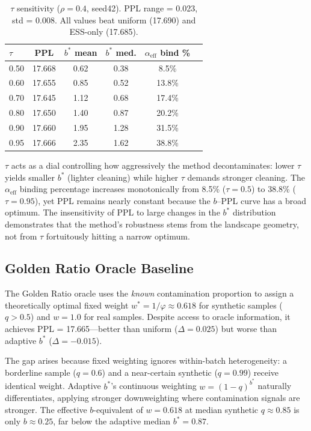 \documentclass[11pt,a4paper]{article}
\newcommand{\bstar}{b^{*}}
\newcommand{\aeff}{\alpha_{\mathrm{eff}}}
\begin{document}
\begin{table}[t]
\centering
\small
\caption{$\tau$ sensitivity ($\rho{=}0.4$, seed42). PPL range = 0.023, std = 0.008. All values beat uniform (17.690) and ESS-only (17.685).}
\label{tab:tau}
\begin{tabular}{lccccc}
\toprule
$\tau$ & PPL & $\bstar$ mean & $\bstar$ med. & $\aeff$ bind \% \\
\midrule
0.50 & 17.668 & 0.62 & 0.38 &  8.5\% \\
0.60 & 17.655 & 0.85 & 0.52 & 13.8\% \\
0.70 & 17.645 & 1.12 & 0.68 & 17.4\% \\
0.80 & 17.650 & 1.40 & 0.87 & 20.2\% \\
0.90 & 17.660 & 1.95 & 1.28 & 31.5\% \\
0.95 & 17.666 & 2.35 & 1.62 & 38.8\% \\
\bottomrule
\end{tabular}
\end{table}

$\tau$ acts as a dial controlling how aggressively the method decontaminates: lower $\tau$ yields smaller $\bstar$ (lighter cleaning) while higher $\tau$ demands stronger cleaning.
The $\aeff$ binding percentage increases monotonically from 8.5\% ($\tau{=}0.5$) to 38.8\% ($\tau{=}0.95$), yet PPL remains nearly constant because the $b$--PPL curve has a broad optimum.
The insensitivity of PPL to large changes in the $\bstar$ distribution demonstrates that the method's robustness stems from the landscape geometry, not from $\tau$ fortuitously hitting a narrow optimum.


\subsection{Golden Ratio Oracle Baseline}
\label{sec:golden_ratio}

The Golden Ratio oracle uses the \emph{known} contamination proportion to assign a theoretically optimal fixed weight $w^* = 1/\varphi \approx 0.618$ for synthetic samples ($q > 0.5$) and $w = 1.0$ for real samples.
Despite access to oracle information, it achieves PPL = 17.665---better than uniform ($\Delta = 0.025$) but worse than adaptive $\bstar$ ($\Delta = -0.015$).

The gap arises because fixed weighting ignores within-batch heterogeneity: a borderline sample ($q = 0.6$) and a near-certain synthetic ($q = 0.99$) receive identical weight.
Adaptive $\bstar$'s continuous weighting $w = (1-q)^{b^*}$ naturally differentiates, applying stronger downweighting where contamination signals are stronger.
The effective $b$-equivalent of $w = 0.618$ at median synthetic $q \approx 0.85$ is only $b \approx 0.25$, far below the adaptive median $\bstar = 0.87$.
\end{document}

